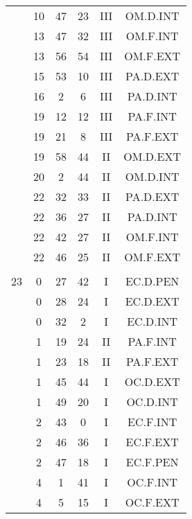 \documentclass[12pt, a4paper]{article}
\begin{document}
\begin{multicols}{3}
{\begin{tabular}{c c c c c c}
	 	 	 	 & 10 & 47 & 23 & III & OM.D.INT\\%
	 	 	 	 & 13 & 47 & 32 & III & OM.F.INT\\%
	 	 	 	 & 13 & 56 & 54 & III & OM.F.EXT\\%
	 	 	 	 & 15 & 53 & 10 & III & PA.D.EXT\\%
	 	 	 	 & 16 & 2 & 6 & III & PA.D.INT\\%
	 	 	 	 & 19 & 12 & 12 & III & PA.F.INT\\%
	 	 	 	 & 19 & 21 & 8 & III & PA.F.EXT\\%
	 	 	 	 & 19 & 58 & 44 & II & OM.D.EXT\\%
	 	 	 	 & 20 & 2 & 44 & II & OM.D.INT\\%
	 	 	 	 & 22 & 32 & 33 & II & PA.D.EXT\\%
	 	 	 	 & 22 & 36 & 27 & II & PA.D.INT\\%
	 	 	 	 & 22 & 42 & 27 & II & OM.F.INT\\%
	 	 	 	 & 22 & 46 & 25 & II & OM.F.EXT\\%
	 	 	 	 & & & & & \\%
	 	 	 	23 & 0 & 27 & 42 & I & EC.D.PEN\\%
	 	 	 	 & 0 & 28 & 24 & I & EC.D.EXT\\%
	 	 	 	 & 0 & 32 & 2 & I & EC.D.INT\\%
	 	 	 	 & 1 & 19 & 24 & II & PA.F.INT\\%
	 	 	 	 & 1 & 23 & 18 & II & PA.F.EXT\\%
	 	 	 	 & 1 & 45 & 44 & I & OC.D.EXT\\%
	 	 	 	 & 1 & 49 & 20 & I & OC.D.INT\\%
	 	 	 	 & 2 & 43 & 0 & I & EC.F.INT\\%
	 	 	 	 & 2 & 46 & 36 & I & EC.F.EXT\\%
	 	 	 	 & 2 & 47 & 18 & I & EC.F.PEN\\%
	 	 	 	 & 4 & 1 & 41 & I & OC.F.INT\\%
	 	 	 	 & 4 & 5 & 15 & I & OC.F.EXT\\%
	 	 \end{tabular}
 	}
\end{multicols}
\end{document}
